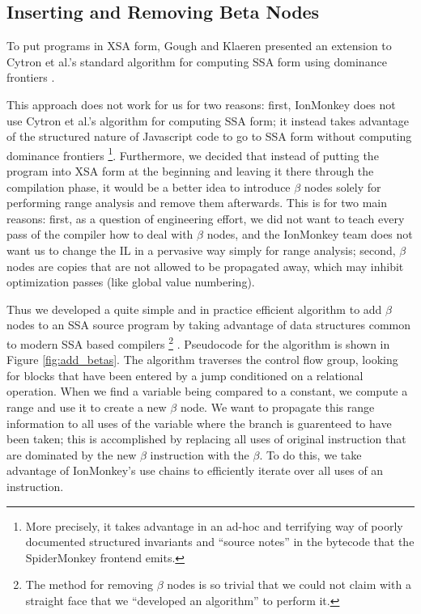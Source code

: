 \documentclass{article}
\begin{document}
\subsection{Inserting and Removing Beta Nodes}
To put programs in XSA form, Gough and Klaeren presented an extension
to Cytron et al.'s standard algorithm for computing SSA form using
dominance frontiers \cite{Cytron:1991:ECS:115372.115320}.

This approach does not work for us for two reasons: first, IonMonkey
does not use Cytron et al.'s algorithm for computing SSA form; it
instead takes advantage of the structured nature of Javascript code to
go to SSA form without computing dominance frontiers \footnote{More
  precisely, it takes advantage in an ad-hoc and terrifying way of
  poorly documented structured invariants and ``source notes'' in the
  bytecode that the SpiderMonkey frontend emits.}.  Furthermore, we
decided that instead of putting the program into XSA form at the
beginning and leaving it there through the compilation phase, it would
be a better idea to introduce $\beta$ nodes solely for performing
range analysis and remove them afterwards. This is for two main
reasons: first, as a question of engineering effort, we did not want
to teach every pass of the compiler how to deal with $\beta$ nodes,
and the IonMonkey team does not want us to change the IL in a pervasive
way simply for range analysis; second, $\beta$ nodes are copies that
are not allowed to be propagated away, which may inhibit optimization
passes (like global value numbering).

Thus we developed a quite simple and in practice efficient algorithm to
add $\beta$ nodes to an SSA source program by taking
advantage of data structures common to modern SSA based compilers
\footnote{The method for removing $\beta$ nodes is so trivial that we
  could not claim with a straight face that we ``developed an
  algorithm'' to perform it.} .  Pseudocode for the algorithm is shown
in Figure \ref{fig:add_betas}. The algorithm traverses the control
flow group, looking for blocks that have been entered by a jump
conditioned on a relational operation. When we find a variable being
compared to a constant, we compute a range and use it to create a new
$\beta$ node. We want to propagate this range information to all uses
of the variable where the branch is guarenteed to have been taken;
this is accomplished by replacing all uses of original instruction
that are dominated by the new $\beta$ instruction with the $\beta$. To
do this, we take advantage of IonMonkey's use chains to efficiently
iterate over all uses of an instruction.
\end{document}
